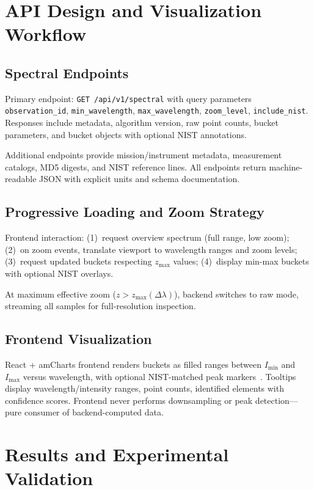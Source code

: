\documentclass[11pt,a4paper]{article}
\begin{document}
\section{API Design and Visualization Workflow}
\label{sec:api}

\subsection{Spectral Endpoints}

Primary endpoint: \texttt{GET /api/v1/spectral} with query parameters \texttt{observation\_id}, \texttt{min\_wavelength}, \texttt{max\_wavelength}, \texttt{zoom\_level}, \texttt{include\_nist}. Responses include metadata, algorithm version, raw point counts, bucket parameters, and bucket objects with optional NIST annotations.

Additional endpoints provide mission/instrument metadata, measurement catalogs, MD5 digests, and NIST reference lines. All endpoints return machine-readable JSON with explicit units and schema documentation.

\subsection{Progressive Loading and Zoom Strategy}

Frontend interaction: (1)~request overview spectrum (full range, low zoom); (2)~on zoom events, translate viewport to wavelength ranges and zoom levels; (3)~request updated buckets respecting $z_{\max}$ values; (4)~display min-max buckets with optional NIST overlays.

At maximum effective zoom ($z > z_{\max}(\Delta\lambda)$), backend switches to raw mode, streaming all samples for full-resolution inspection.

\subsection{Frontend Visualization}

React + amCharts frontend renders buckets as filled ranges between $I_{\min}$ and $I_{\max}$ versus wavelength, with optional NIST-matched peak markers~\cite{amCharts}. Tooltips display wavelength/intensity ranges, point counts, identified elements with confidence scores. Frontend never performs downsampling or peak detection—pure consumer of backend-computed data.

\section{Results and Experimental Validation}
\label{sec:results}
\end{document}
